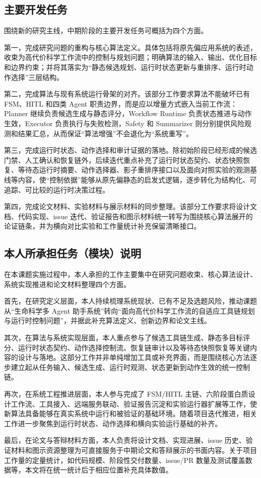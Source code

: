 \subsection{主要开发任务}

围绕新的研究主线，中期阶段的主要开发任务可概括为四个方面。

第一，完成研究问题的重构与核心算法定义。具体包括将原先偏应用系统的表述，收束为高代价科学工作流中的控制与规划问题；明确算法的输入、输出、优化目标和边界约束；并将其落实为“静态候选规划、运行时状态更新与重排序、运行时动作选择”三层结构。

第二，完成算法与现有系统运行骨架的对齐。该部分工作要求算法不能破坏已有 FSM、HITL 和四类 Agent 职责边界，而是应以增量方式嵌入当前工作流：Planner 继续负责候选生成与静态评分，Workflow Runtime 负责状态推进与动作生效，Executor 负责执行与失败检测，Safety 和 Summarizer 则分别提供风险观测和结果汇总，从而保证“算法增强”不会退化为“系统重写”。

第三，完成运行时状态、动作选择和审计证据的落地。除初始阶段已经形成的候选门禁、人工确认和恢复链外，后续迭代重点补充了运行时状态契约、状态快照恢复、等待态运行时摘要、动作选择器、影子重排序接口以及面向对照实验的观测基线等内容，使“控制依据”能够从原先偏静态的启发式逻辑，逐步转化为结构化、可追踪、可比较的运行时决策过程。

第四，完成论文材料、实验材料与展示材料的同步整理。该部分工作要求将设计文档、代码实现、issue 迭代、验证报告和图示材料统一转写为围绕核心算法展开的论证链条，并为横向对比实验和工作量统计补充保留清晰接口。

\subsection{本人所承担任务（模块）说明}

在本课题实施过程中，本人承担的工作主要集中在研究问题收束、核心算法设计、系统实现推进和论文材料整理四个方面。

首先，在研究定义层面，本人持续梳理系统现状、已有不足及选题风险，推动课题从“生命科学多 Agent 助手系统”转向“面向高代价科学工作流的自适应工具链规划与运行时控制问题”，并据此补充算法定义、创新边界和论文主线。

其次，在算法与系统实现层面，本人重点参与了候选工具链生成、静态多目标评分、运行时状态契约、动作选择控制流、恢复链审计以及等待态快照恢复等关键内容的设计与落地。这部分工作并非单纯增加工具或补充界面，而是围绕核心方法逐步建立起从任务输入、候选生成、运行时观测、状态更新到动作生效的统一控制链。

再次，在系统工程推进层面，本人参与完成了 FSM/HITL 主链、六阶段蛋白质设计工作流、工具接入、远端服务联动、验证报告沉淀和实验运行器扩展等工作，使新算法具备能够在真实系统中运行和被验证的基础环境。随着项目迭代推进，相关工作进一步聚焦到运行时状态、动作选择和横向实验运行基础的补齐。

最后，在论文与答辩材料方面，本人负责将设计文档、实现进展、issue 历史、验证材料和图示资源整理为可直接服务于中期论文和答辩展示的书面内容。关于项目工作量的定量统计，如代码规模、阶段性交付数量、issue/PR 数量及测试覆盖数据等，本文将在统一统计后于相应位置补充具体数值。
